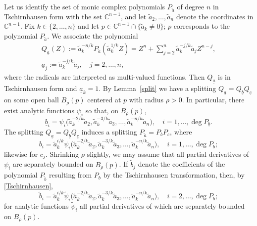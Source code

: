 \documentclass[12pt]{amsart}
\theoremstyle{plain}
\theoremstyle{definition}
\numberwithin{equation}{section}
\begin{document}
Let us identify the set of monic complex polynomials $P_{\tilde a}$ of degree $n$ in Tschirnhausen form with the set ${\mathbb{C}}^{n-1}$, and 
let $\tilde a_2,\ldots,\tilde a_n$ denote the coordinates in ${\mathbb{C}}^{n-1}$.
Fix $k \in \{2,\ldots,n\}$ and let $p \in {\mathbb{C}}^{n-1} \cap \{\tilde a_k \ne 0\}$; $p$ corresponds to the polynomial $P_{\tilde a}$. 
We associate the polynomial 
\begin{gather*}
  Q_{\underline a}(Z) := \tilde a_k^{- n/k} P_{\tilde a} (\tilde a_k^{1/k} Z) 
  = Z^n + \sum_{j=2}^n \tilde a_k^{- j/k} \tilde a_j Z^{n-j},\\
  \underline a_j := \tilde a_k^{- j/k} \tilde a_j, \quad j = 2,\ldots, n, 
\end{gather*}
where the radicals are interpreted as multi-valued functions. Then $Q_{\underline a}$ is in Tschirnhausen form and $\underline a_k =1$. 
By Lemma~\ref{split} we have a splitting $Q_{\underline a} = Q_{\underline b} Q_{\underline c}$ on some open ball $B_{\rho}(p)$ 
centered at $p$ with radius ${\rho}>0$. 
In particular, there exist analytic functions ${\psi}_i$ so that, on $B_{\rho}(p)$,
\begin{equation*} 
  \underline b_i = {\psi}_i \big(\tilde a_k^{-2/k} \tilde a_2, \tilde a_k^{-3/k} \tilde a_3, \ldots, \tilde a_k^{-n/k} \tilde a_n\big), 
    \quad i = 1,\ldots,\deg P_{\underline b}.
\end{equation*}
The splitting $Q_{\underline a} = Q_{\underline b} Q_{\underline c}$ induces a splitting 
$P_{\tilde a} = P_b P_c$, where 
\begin{equation} \label{eq:bj}
    b_i = \tilde a_k^{i/k} {\psi}_i \big(\tilde a_k^{-2/k} \tilde a_2, \tilde a_k^{-3/k} \tilde a_3, \ldots, \tilde a_k^{-n/k} \tilde a_n\big), 
    \quad i = 1,\ldots,\deg P_b;
\end{equation}
likewise for $c_j$. 
Shrinking ${\rho}$ slightly, we may assume that all partial derivatives of ${\psi}_i$ are separately bounded on $B_{\rho}(p)$. 
If $\tilde b_j$ denote the coefficients of the polynomial $P_{\tilde b}$ resulting from $P_b$ by the  
Tschirnhausen transformation, then, by \eqref{Tschirnhausen}, 
\begin{equation} \label{eq:tildebj}
    \tilde b_i = \tilde a_k^{i/k} 
    \tilde {\psi}_i \big(\tilde a_k^{-2/k} \tilde a_2, \tilde a_k^{-3/k} \tilde a_3, \ldots, \tilde a_k^{-n/k} \tilde a_n\big), 
    \quad i = 2,\ldots,\deg P_b;
\end{equation}
for analytic functions $\tilde {\psi}_i$ all partial derivatives of which are separately bounded on $B_{\rho}(p)$.
\end{document}
